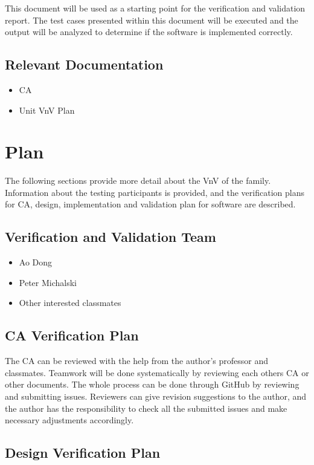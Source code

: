 \documentclass[12pt, titlepage]{article}
\begin{document}
This document will be used as a starting point for the verification and
validation report.  The test cases presented within this document will be
executed and the output will be analyzed to determine if the software is
implemented correctly.

\subsection{Relevant Documentation}

\begin{itemize}
    \item CA
    \item Unit VnV Plan
\end{itemize}

\section{Plan}
\label{sec_plan} The following sections provide more detail about the VnV of the
\progname{} family. Information about the testing participants is provided, and
the verification plans for CA, design, implementation and validation plan for
software are described.
\subsection{Verification and Validation Team}

\begin{itemize}
    \item Ao Dong
    \item Peter Michalski
    \item Other interested classmates
\end{itemize}

\subsection{CA Verification Plan}

The CA can be reviewed with the help from the author's professor and
classmates. Teamwork will be done systematically by reviewing each others CA or
other documents. The whole process can be done through GitHub by reviewing and
submitting issues. Reviewers can give revision suggestions to the author, and
the author has the responsibility to check all the submitted issues and make
necessary adjustments accordingly.

\subsection{Design Verification Plan}
\end{document}
